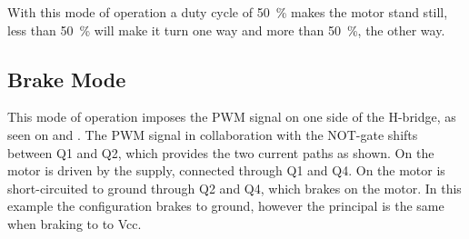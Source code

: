 \begin{minipage}{\linewidth}
\begin{minipage}{0.45\linewidth}
\begin{figure}[H]
  			\centering
  			\vspace{-.4cm}
  			\captionsetup{justification=centering}
  			\label{HbridgeCounterClokwise4Q}
  		\end{figure}\vspace{-5mm}
  	\end{minipage}
  \end{minipage}

With this mode of operation a duty cycle of \si{50 \%} makes the motor stand still, less than \si{50 \%} will make it turn one way and more than \si{50 \%}, the other way.

\subsection{Brake Mode}
This mode of operation imposes the PWM signal on one side of the H-bridge, as seen on  and . The PWM signal in collaboration with the NOT-gate shifts between Q1 and Q2, which provides the two current paths as shown. On  the motor is driven by the supply, connected through Q1 and Q4. On  the motor is short-circuited to ground through Q2 and Q4, which brakes on the motor. In this example the configuration brakes to ground, however the principal is the same when braking to to Vcc.\cite{PAndersen}

